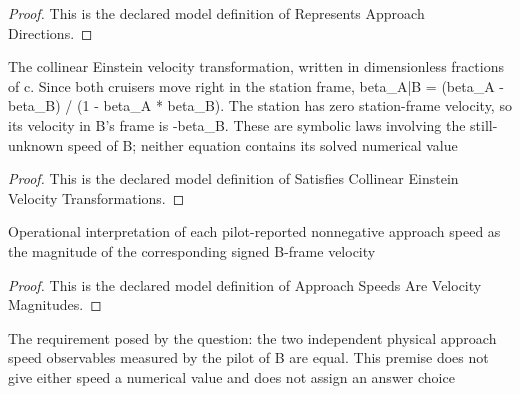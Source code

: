 \begin{proof}
  This is the declared model definition of Represents Approach Directions.
\end{proof}
\begin{definition}
  \label{def:physics:phyx-mini-0589:phyxminiproblems-problemphyxmini0589-satisfiescollineareinsteinvelocitytransformations}
  The collinear Einstein velocity transformation, written in dimensionless fractions of c. Since both cruisers move right in the station frame, beta\_A|B = (beta\_A - beta\_B) / (1 - beta\_A * beta\_B). The station has zero station-frame velocity, so its velocity in B's frame is -beta\_B. These are symbolic laws involving the still-unknown speed of B; neither equation contains its solved numerical value
\end{definition}
\begin{proof}
  This is the declared model definition of Satisfies Collinear Einstein Velocity Transformations.
\end{proof}
\begin{definition}
  \label{def:physics:phyx-mini-0589:phyxminiproblems-problemphyxmini0589-approachspeedsarevelocitymagnitudes}
  Operational interpretation of each pilot-reported nonnegative approach speed as the magnitude of the corresponding signed B-frame velocity
\end{definition}
\begin{proof}
  This is the declared model definition of Approach Speeds Are Velocity Magnitudes.
\end{proof}
\begin{definition}
  \label{def:physics:phyx-mini-0589:phyxminiproblems-problemphyxmini0589-pilotseesequalapproachspeeds}
  The requirement posed by the question: the two independent physical approach speed observables measured by the pilot of B are equal. This premise does not give either speed a numerical value and does not assign an answer choice
\end{definition}
